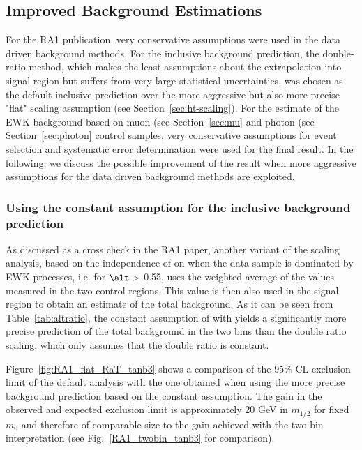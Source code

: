\subsection{Improved Background Estimations \label{sec:improved-background}}

For the RA1 publication, very conservative assumptions were used in
the data driven background methods. For the inclusive background
prediction, the double-ratio method, which makes the least assumptions
about the \scalht extrapolation into signal region but suffers from
very large statistical uncertainties, was chosen as the default
inclusive prediction over the more aggressive but also more precise
"flat" scaling assumption (see Section~\ref{sec:ht-scaling}). For the
estimate of the EWK background based on muon (see Section~\ref{sec:mu}
and photon (see Section~\ref{sec:photon} control samples, very
conservative assumptions for event selection and systematic error
determination were used for the final result. In the following, we
discuss the possible improvement of the result when more aggressive
assumptions for the data driven background methods are exploited.

\subsubsection{Using the constant  \RaT assumption for the inclusive background prediction\label{sec:flat-rat}}     

As discussed as a cross check in the RA1 paper, another variant of the
\scalht scaling analysis, based on the independence of \RaT on \scalht
when the data sample is dominated by EWK processes, i.e. for $\alt >$
0.55, uses the weighted average of the \RaT values measured in the two
\scalht control regions. This value is then also used in the signal
region to obtain an estimate of the total background. As it can be
seen from Table~\ref{tab:altratio}, the constant assumption of \RaT
with \scalht yields a significantly more precise prediction of the
total background in the two \scalht bins than the double ratio
scaling, which only assumes that the double ratio is constant.

Figure~\ref{fig:RA1_flat_RaT_tanb3} shows a comparison of the 95\% CL
exclusion limit of the default analysis with the one obtained when
using the more precise background prediction based on the constant
\RaT assumption. The gain in the observed and expected exclusion limit
is approximately 20 GeV in $m_{1/2}$ for fixed $m_0$ and therefore of
comparable size to the gain achieved with the two-bin interpretation
(see Fig.~\ref{RA1_twobin_tanb3} for comparison).

